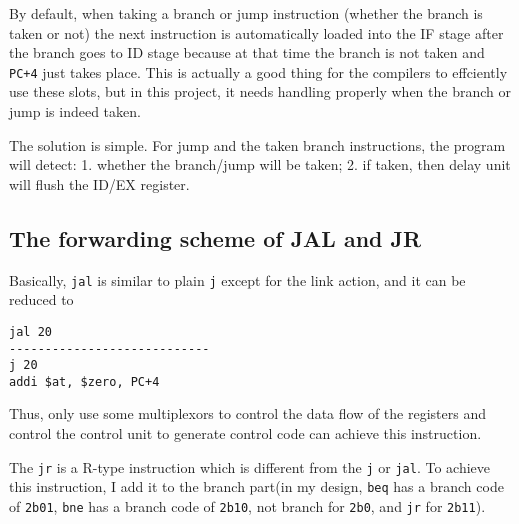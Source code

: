\documentclass[
]{article}
\begin{document}
By default, when taking a branch or jump instruction (whether the branch
is taken or not) the next instruction is automatically loaded into the
IF stage after the branch goes to ID stage because at that time the
branch is not taken and \texttt{PC+4} just takes place. This is actually
a good thing for the compilers to effciently use these slots, but in
this project, it needs handling properly when the branch or jump is
indeed taken.

The solution is simple. For jump and the taken branch instructions, the
program will detect: 1. whether the branch/jump will be taken; 2. if
taken, then delay unit will flush the ID/EX register.

\hypertarget{header-n43}{%
\subsection{\texorpdfstring{The forwarding scheme of JAL and JR
}{The forwarding scheme of JAL and JR }}\label{header-n43}}

Basically, \texttt{jal} is similar to plain \texttt{j} except for the
link action, and it can be reduced to

\begin{verbatim}
jal 20
----------------------------
j 20
addi $at, $zero, PC+4
\end{verbatim}

Thus, only use some multiplexors to control the data flow of the
registers and control the control unit to generate control code can
achieve this instruction.

The \texttt{jr} is a R-type instruction which is different from the
\texttt{j} or \texttt{jal}. To achieve this instruction, I add it to the
branch part(in my design, \texttt{beq} has a branch code of
\texttt{2\textquotesingle{}b01}, \texttt{bne} has a branch code of
\texttt{2\textquotesingle{}b10}, not branch for
\texttt{2\textquotesingle{}b0}, and \texttt{jr} for
\texttt{2\textquotesingle{}b11}).
\end{document}
